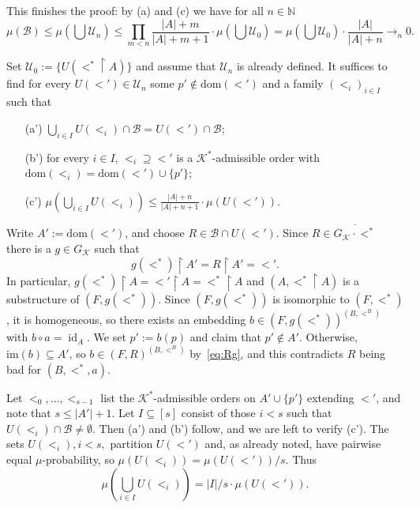 \documentclass[12pt]{amsart}
\theoremstyle{plain}
\theoremstyle{definition}
\begin{document}
This finishes the proof: by (a) and (c) we have for all $n\in\mathbb N$
$$\textstyle
\mu(\mathcal B)\le \mu(\bigcup\mathcal U_n)\le 
\prod_{m<n}\frac{|A|+m}{|A|+m+1}\cdot \mu(\bigcup\mathcal U_0)=\mu(\bigcup\mathcal U_0)\cdot \frac{|A|}{|A|+n}\to_n 0.
$$

 Set $\mathcal U_0:=\{U(<^*\upharpoonright A)\}$ and assume that 
$\mathcal U_n$ is already defined. It suffices to find for every $U(<')\in\mathcal U_n$
some $p'\notin{\textrm{dom}}(<')$ and a family $(<_i)_{i\in I}$ such that
\begin{enumerate}
\item[(a')] $\bigcup_{i\in I}U(<_i)\cap\mathcal B=U(<')\cap\mathcal B$;
\item[(b')]  for every $i\in I$, $<_i\supseteq <'$  is a ${\mathcal K}^*$-admissible order with ${\textrm{dom}}(<_i)={\textrm{dom}}(<')\cup\{p'\}$;
\item[(c')] $\mu(\bigcup_{i\in I}U(<_i))\le\frac{|A|+n}{|A|+n+1}\cdot\mu(U(<'))$.
\end{enumerate}

Write $A':={\textrm{dom}}(<')$, and choose $R\in \mathcal B\cap U(<')$. Since 
$R\in \overline{G_{\mathcal K}\cdot <^*}$ there is a $g\in G_{\mathcal K}$ such that 
\begin{equation}\label{eq:Rg}\textstyle
 g(<^*)\upharpoonright A'= R\upharpoonright A'=<'.
\end{equation}
In particular, 
$g(<^*)\upharpoonright A=<'\upharpoonright A=<^*\upharpoonright A$ and
$(A,<^*\upharpoonright A)$ is a substructure of $(F,g(<^*))$. Since
$(F,g(<^*))$ is isomorphic to $(F,<^*)$, it is homogeneous, so
there exists an embedding $b\in (F,g(<^*))^{(B,<^B)}$ with $b\circ a=\operatorname{id}_A$. 
We set $p':=b(p)$ and claim that $p'\notin A'$. Otherwise, ${\mathrm{im}}(b)\subseteq A'$, so 
$b\in (F,R)^{(B,<^B)}$ by~\eqref{eq:Rg}, and this contradicts $R$ being bad for $(B, <^*, a)$.

Let $<_0,\ldots,<_{s-1}$ list the ${\mathcal K}^*$-admissible orders on $A'\cup\{p'\}$ 
extending $<'$, and note that $s\le |A'|+1$. Let $I\subseteq[s]$ consist of those $i<s$ such that 
$U(<_i)\cap\mathcal B\neq\emptyset$. Then (a') and (b') follow, and
we are left to verify (c'). The sets $U(<_i),i<s,$ partition $U(<')$ and, as already noted, 
have pairwise equal $\mu$-probability, so $\mu(U(<_i))=\mu(U(<'))/s$. Thus
\begin{equation}\label{eq:I}\textstyle
\mu(\bigcup_{i\in I}U(<_i))=|I|/s\cdot\mu(U(<')). 
\end{equation}
\end{document}
